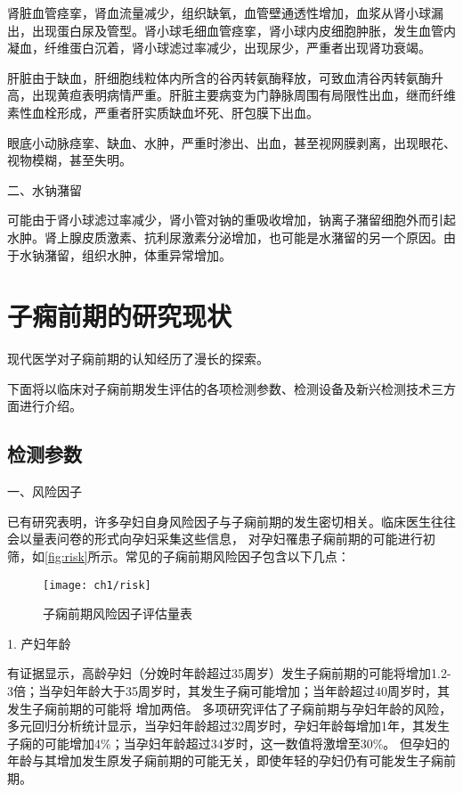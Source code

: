 肾脏血管痉挛，肾血流量减少，组织缺氧，血管壁通透性增加，血浆从肾小球漏出，出现蛋白尿及管型。肾小球毛细血管痉挛，肾小球内皮细胞肿胀，发生血管内凝血，纤维蛋白沉着，肾小球滤过率减少，出现尿少，严重者出现肾功衰竭。

肝脏由于缺血，肝细胞线粒体内所含的谷丙转氨酶释放，可致血清谷丙转氨酶升高，出现黄疸表明病情严重。肝脏主要病变为门静脉周围有局限性出血，继而纤维素性血栓形成，严重者肝实质缺血坏死、肝包膜下出血。

眼底小动脉痉挛、缺血、水肿，严重时渗出、出血，甚至视网膜剥离，出现眼花、视物模糊，甚至失明。

二、水钠潴留　

可能由于肾小球滤过率减少，肾小管对钠的重吸收增加，钠离子潴留细胞外而引起水肿。肾上腺皮质激素、抗利尿激素分泌增加，也可能是水潴留的另一个原因。由于水钠潴留，组织水肿，体重异常增加。

\section{子痫前期的研究现状}
现代医学对子痫前期的认知经历了漫长的探索\cite{BJOG2016}。

下面将以临床对子痫前期发生评估的各项检测参数、检测设备及新兴检测技术三方面进行介绍。
\subsection{检测参数}
一、风险因子

已有研究表明，许多孕妇自身风险因子与子痫前期的发生密切相关\cite{Magee2008,FIGO,Lowe2015,Heazell2010}。临床医生往往会以量表问卷的形式向孕妇采集这些信息，
对孕妇罹患子痫前期的可能进行初筛\cite{risks}，如\autoref{fig:risk}所示。常见的子痫前期风险因子包含以下几点：
\begin{figure}[htbp]
    \centering
    \texttt{[image: ch1/risk]}
    \caption{\label{fig:risk}子痫前期风险因子评估量表}
\end{figure}

1. 产妇年龄

有证据显示，高龄孕妇（分娩时年龄超过35周岁）发生子痫前期的可能将增加1.2-3倍；当孕妇年龄大于35周岁时，其发生子痫可能增加；当年龄超过40周岁时，其发生子痫前期的可能将
增加两倍\cite{Duckitt2005,FIGO,Yogev2010}。
多项研究评估了子痫前期与孕妇年龄的风险，多元回归分析统计显示，当孕妇年龄超过32周岁时，孕妇年龄每增加1年，其发生子痫的可能增加4\%；当孕妇年龄超过34岁时，这一数值将激增至30\%。
但孕妇的年龄与其增加发生原发子痫前期的可能无关，即使年轻的孕妇仍有可能发生子痫前期\cite{Duckitt2005,Poon2010}。

